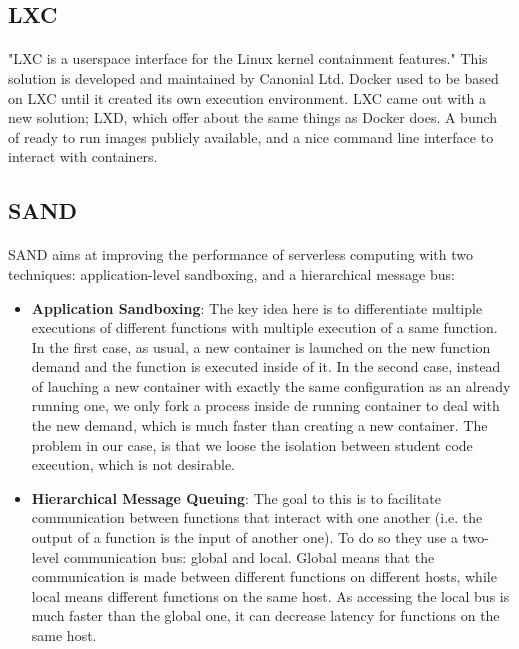 \subsection{LXC}
\paragraph{}"LXC is a userspace interface for the Linux kernel containment features."\cite{lxc}  This solution is developed and maintained by Canonial Ltd.  Docker used to be based on LXC until it created its own execution environment.  LXC came out with a new solution; LXD, which offer about the same things as Docker does.  A bunch of ready to run images publicly available, and a nice command line interface to interact with containers.  %

\subsection{SAND} 
\paragraph{}SAND\cite{akkus2018sand} aims at improving the performance of serverless computing with two techniques: application-level sandboxing, and a hierarchical message bus:
\begin{itemize}
\renewcommand\labelitemi{--}
  \item \textbf{Application Sandboxing}: The key idea here is to differentiate multiple executions of different functions with multiple execution of a same function.  In the first case, as usual, a new container is launched on the new function demand and the function is executed inside of it.  In the second case, instead of lauching a new container with exactly the same configuration as an already running one, we only fork a process inside de running container to deal with the new demand, which is much faster than creating a new container.  The problem in our case, is that we loose the isolation between student code execution, which is not desirable.
  \item \textbf{Hierarchical Message Queuing}: The goal to this is to facilitate communication between functions that interact with one another (i.e. the output of a function is the input of another one).  To do so they use a two-level communication bus: global and local.  Global means that the communication is made between different functions on different hosts, while local means different functions on the same host.  As accessing the local bus is much faster than the global one, it can decrease latency for functions on the same host.  %
\end{itemize}

